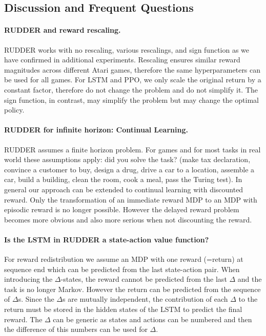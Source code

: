 \documentclass{article}
\begin{document}
\begin{appendices}
\clearpage
\pagebreak
\section{Discussion and Frequent Questions}

\paragraph{RUDDER and reward rescaling.}
RUDDER works with no rescaling, various rescalings, and sign function 
as we have confirmed in additional experiments.
Rescaling ensures similar reward magnitudes across different Atari games, 
therefore the same hyperparameters can be used for all games. 
For LSTM and PPO, we only scale the original return by a constant factor, 
therefore do not change the problem and do not simplify it. 
The sign function, in contrast, may simplify the problem 
but may change the optimal policy.

\paragraph{RUDDER for infinite horizon: Continual Learning.}
RUDDER assumes a finite horizon problem.
For games and for most tasks in real world these assumptions apply: 
did you solve the task? (make tax declaration, convince a customer to buy, 
design a drug, drive a car to a location, 
assemble a car, build a building, clean the room, cook a meal, pass the Turing test). 
In general our approach can be extended to continual learning with discounted reward. 
Only the transformation of an immediate reward MDP 
to an MDP with episodic reward is no longer possible. 
However the delayed reward problem becomes more obvious and also 
more serious when not discounting the reward.

\paragraph{Is the LSTM in RUDDER a state-action value function?}
For reward redistribution we assume an MDP with one reward (=return) 
at sequence end which can be predicted from the last state-action pair. 
When introducing the $\Delta$-states, 
the reward cannot be predicted from the last $\Delta$ 
and the task is no longer Markov. 
However the return can be predicted from the sequence of $\Delta$s. 
Since the $\Delta$s are mutually independent, 
the contribution of each $\Delta$ to the return must be stored 
in the hidden states of the LSTM to predict the final reward. 
The $\Delta$ can be generic as states and actions can be numbered 
and then the difference of this numbers can be used for $\Delta$.


\end{appendices}
\end{document}
